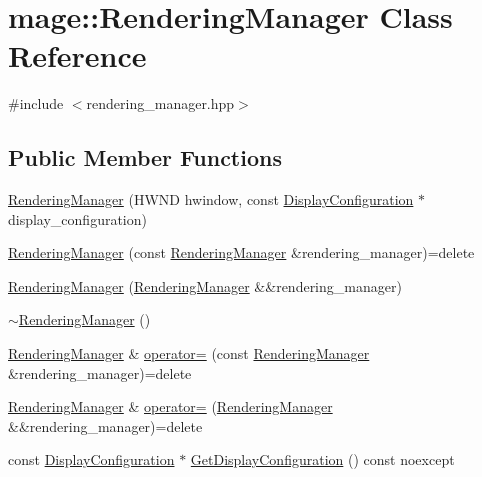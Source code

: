 \hypertarget{classmage_1_1_rendering_manager}{}\section{mage\+:\+:Rendering\+Manager Class Reference}
\label{classmage_1_1_rendering_manager}


{\ttfamily \#include $<$rendering\+\_\+manager.\+hpp$>$}

\subsection*{Public Member Functions}
\begin{DoxyCompactItemize}
\item 
\hyperlink{classmage_1_1_rendering_manager_aaff7375b93bf6019ff7aafb845b1a7a0}{Rendering\+Manager} (H\+W\+ND hwindow, const \hyperlink{structmage_1_1_display_configuration}{Display\+Configuration} $\ast$display\+\_\+configuration)
\item 
\hyperlink{classmage_1_1_rendering_manager_a662f30a01e5e0f1b95f2877981a2f1df}{Rendering\+Manager} (const \hyperlink{classmage_1_1_rendering_manager}{Rendering\+Manager} \&rendering\+\_\+manager)=delete
\item 
\hyperlink{classmage_1_1_rendering_manager_af3645720626dc0151fdec80097e0364b}{Rendering\+Manager} (\hyperlink{classmage_1_1_rendering_manager}{Rendering\+Manager} \&\&rendering\+\_\+manager)
\item 
\hyperlink{classmage_1_1_rendering_manager_a4164e70f014de8d0348c35d5142cedab}{$\sim$\+Rendering\+Manager} ()
\item 
\hyperlink{classmage_1_1_rendering_manager}{Rendering\+Manager} \& \hyperlink{classmage_1_1_rendering_manager_af34a5ba3b8b585124f84f4c70866546b}{operator=} (const \hyperlink{classmage_1_1_rendering_manager}{Rendering\+Manager} \&rendering\+\_\+manager)=delete
\item 
\hyperlink{classmage_1_1_rendering_manager}{Rendering\+Manager} \& \hyperlink{classmage_1_1_rendering_manager_a6f71bc364063de61d07490ef9896158c}{operator=} (\hyperlink{classmage_1_1_rendering_manager}{Rendering\+Manager} \&\&rendering\+\_\+manager)=delete
\item 
const \hyperlink{structmage_1_1_display_configuration}{Display\+Configuration} $\ast$ \hyperlink{classmage_1_1_rendering_manager_a4d134773977675c902974bb3f914370e}{Get\+Display\+Configuration} () const noexcept
\item 

\end{DoxyCompactItemize}
